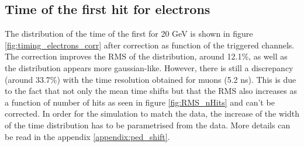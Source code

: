 \subsection{Time of the first hit for electrons}
\label{subsec:Electron_Final}

The distribution of the time of the first for 20 GeV is shown in figure \ref{fig:timing_electrons_corr} after correction as function of the triggered channels. The correction improves the RMS of the distribution, around 12.1\%, as well as the distribution appears more gaussian-like. However, there is still a discrepancy (around 33.7\%) with the time resolution obtained for muons (5.2 ns). This is due to the fact that not only the mean time shifts but that the RMS also increases as a function of number of hits as seen in figure \ref{fig:RMS_nHits} and can't be corrected. In order for the simulation to match the data, the increase of the width of the time distribution has to be parametrised from the data. More details can be read in the appendix \ref{appendix:ped_shift}.

